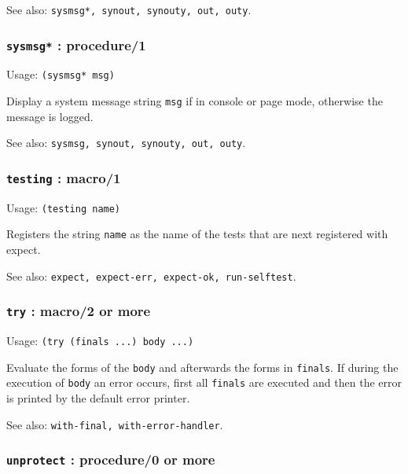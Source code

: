 \documentclass[
]{article}
\newcommand{\passthrough}[1]{#1}
\begin{document}
See also: \passthrough{\lstinline!sysmsg*, synout, synouty, out, outy!}.

\hypertarget{sysmsg-procedure1-1}{%
\subsubsection{\texorpdfstring{\texttt{sysmsg*} :
procedure/1}{sysmsg* : procedure/1}}\label{sysmsg-procedure1-1}}

Usage: \passthrough{\lstinline!(sysmsg* msg)!}

Display a system message string \passthrough{\lstinline!msg!} if in
console or page mode, otherwise the message is logged.

See also: \passthrough{\lstinline!sysmsg, synout, synouty, out, outy!}.

\hypertarget{testing-macro1}{%
\subsubsection{\texorpdfstring{\texttt{testing} :
macro/1}{testing : macro/1}}\label{testing-macro1}}

Usage: \passthrough{\lstinline!(testing name)!}

Registers the string \passthrough{\lstinline!name!} as the name of the
tests that are next registered with expect.

See also:
\passthrough{\lstinline!expect, expect-err, expect-ok, run-selftest!}.

\hypertarget{try-macro2-or-more}{%
\subsubsection{\texorpdfstring{\texttt{try} : macro/2 or
more}{try : macro/2 or more}}\label{try-macro2-or-more}}

Usage: \passthrough{\lstinline!(try (finals ...) body ...)!}

Evaluate the forms of the \passthrough{\lstinline!body!} and afterwards
the forms in \passthrough{\lstinline!finals!}. If during the execution
of \passthrough{\lstinline!body!} an error occurs, first all
\passthrough{\lstinline!finals!} are executed and then the error is
printed by the default error printer.

See also: \passthrough{\lstinline!with-final, with-error-handler!}.

\hypertarget{unprotect-procedure0-or-more}{%
\subsubsection{\texorpdfstring{\texttt{unprotect} : procedure/0 or
more}{unprotect : procedure/0 or more}}\label{unprotect-procedure0-or-more}}
\end{document}
